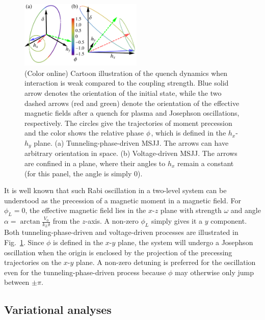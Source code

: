 \documentclass[twocolumn,prl,floatfix,citeautoscript,nofootinbib,superscriptaddress]{revtex4}
\begin{document}
\begin{figure}[t]
\centering
\includegraphics[width=0.52\textwidth]{FigS1.pdf}
\caption{(Color online) Cartoon illustration of the quench dynamics when
interaction is weak compared to the coupling strength. Blue solid arrow
denotes the orientation of the initial state, while the two dashed arrows
(red and green) denote the orientation of the effective magnetic fields
after a quench for plasma and Josephson oscillations, respectively. The
circles give the trajectories of moment precession and the color shows the
relative phase $\protect\phi $, which is defined in the $h_{x}$-$h_{y}$
plane. (a) Tunneling-phase-driven MSJJ. The arrows can have arbitrary
orientation in space. (b) Voltage-driven MSJJ. The arrows are confined in a
plane, where their angles to $h_{x}$ remain a constant (for this panel, the
angle is simply $0$).}
\label{figs1}
\end{figure}

It is well known that such Rabi oscillation in a two-level system can be
understood as the precession of a magnetic moment in a magnetic field. For $%
\phi _{L}=0$, the effective magnetic field lies in the $x$-$z$ plane with
strength $\omega $ and angle $\alpha =\arctan \frac{V_{0}}{k_{L}\delta }$
from the $z$-axis. A non-zero $\phi _{L}$ simply gives it a $y$ component.
Both tunneling-phase-driven and voltage-driven processes are illustrated in
Fig.~\ref{figs1}. Since $\phi $ is defined in the $x$-$y$ plane, the system
will undergo a Josephson oscillation when the origin is enclosed by the
projection of the precessing trajectories on the $x$-$y$ plane. A non-zero
detuning is preferred for the oscillation even for the
tunneling-phase-driven process because $\phi $ may otherwise only jump
between $\pm \pi $.

\subsection{Variational analyses}
\end{document}
